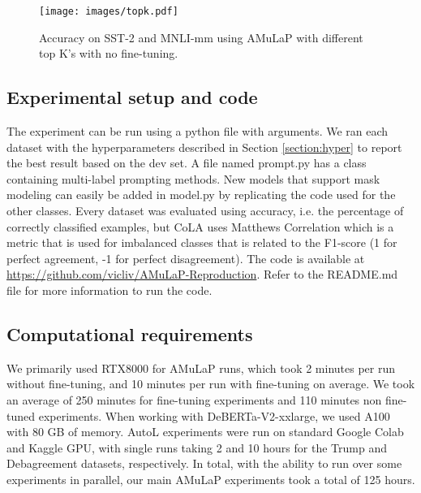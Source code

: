 \begin{figure}[htp]
    \centering
    \texttt{[image: images/topk.pdf]}
    \caption{Accuracy on SST-2 and MNLI-mm using AMuLaP with different top K's with no fine-tuning.}
    \label{fig:topk}
\end{figure}

\subsection{Experimental setup and code}

The experiment can be run using a python file with arguments. We ran each dataset with the hyperparameters described in Section \ref{section:hyper} to report the best result based on the dev set. A file named prompt.py has a class containing multi-label prompting methods. New models that support mask modeling can easily be added in model.py by replicating the code used for the other classes. Every dataset was evaluated using accuracy, i.e. the percentage of correctly classified examples, but CoLA uses Matthews Correlation which is a metric that is used for imbalanced classes that is related to the F1-score (1 for perfect agreement, -1 for perfect disagreement). The code is available at \url{https://github.com/vicliv/AMuLaP-Reproduction}. 
Refer to the README.md file for more information to run the code.

\subsection{Computational requirements}

We primarily used RTX8000 for AMuLaP runs, which took 2 minutes per run without fine-tuning, and 10 minutes per run with fine-tuning on average. We took an average of 250 minutes for fine-tuning experiments and 110 minutes non fine-tuned experiments. When working with DeBERTa-V2-xxlarge, we used A100 with 80 GB of memory. AutoL experiments were run on standard Google Colab and Kaggle GPU, with single runs taking 2 and 10 hours for the Trump and Debagreement datasets, respectively. In total, with the ability to run over some experiments in parallel, our main AMuLaP experiments took a total of 125 hours.


